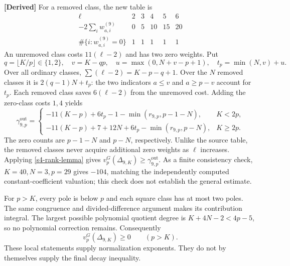 \textbf{[Derived]}
For a removed class, the new table is
\[
\begin{array}{c|rrrrr}
 \ell&2&3&4&5&6\\\hline
 -2\sum_iw^{(9)}_{a,i}&0&5&10&15&20\\
 \#\{i:w^{(9)}_{a,i}=0\}&1&1&1&1&1
\end{array}
\]
An unremoved class costs $11(\ell-2)$ and has two zero weights.
Put
\[
 q=\lfloor K/p\rfloor\in\{1,2\},\quad v=K-qp,\quad
 u=\max(0,N+v-p+1),\quad t_p=\min(N,v)+u.
\]
Over all ordinary classes,
$\sum(\ell-2)=K-p-q+1$.  Over the $N$ removed classes it is
$2(q-1)N+t_p$: the two indicators $a\leq v$ and $a\geq p-v$
account for $t_p$.  Each removed class saves $6(\ell-2)$ from
the unremoved cost.  Adding the zero-class costs $1,4$ yields
\begin{equation}
 \gamma^{\mathrm{out}}_{9,p}=
 \begin{cases}
 -11(K-p)+6t_p-1-\min(r_{9,p},p-1-N),&K<2p,\\
 -11(K-p)+7+12N+6t_p-\min(r_{9,p},p-N),&K\geq2p.
 \end{cases}
 \label{s4-outer-gamma}
\end{equation}
The zero counts are $p-1-N$ and $p-N$, respectively.  Unlike
the source table, the removed classes never acquire additional
zero weights as $\ell$ increases.  Applying
\eqref{s4-rank-lemma} gives
$v_p^G(\Delta_{9,K})\geq\gamma^{\mathrm{out}}_{9,p}$.
As a finite consistency check, $K=40,N=3,p=29$ gives $-104$,
matching the independently computed constant-coefficient
valuation; this check does not establish the general estimate.

For $p>K$, every pole is below $p$ and each square class has at
most two poles.  The same congruence and divided-difference
argument makes its contribution integral.  The largest possible
polynomial quotient degree is $K+4N-2<4p-5$, so no polynomial
correction remains.  Consequently
\begin{equation}
 v_p^G(\Delta_{9,K})\geq0\qquad(p>K).
 \label{s4-large-prime-integrality}
\end{equation}
These local statements supply normalization exponents.  They do
not by themselves supply the final decay inequality.
